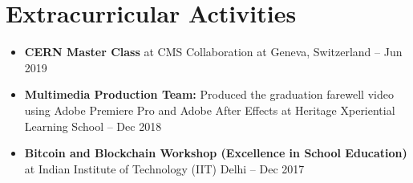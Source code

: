 \documentclass[letterpaper,11pt]{article}
\newcommand{\resumeItem}[1]{
  \item\normalsize{#1}
}
\newcommand{\resumeItemListStart}{\begin{itemize}[leftmargin=0.15in, topsep=1.5pt, itemsep=1.5pt, parsep=0pt]}
\newcommand{\resumeItemListEnd}{\end{itemize}}
\begin{document}
\section{Extracurricular Activities}
\resumeItemListStart
\resumeItem{\textbf{CERN Master Class} at CMS Collaboration at Geneva, Switzerland -- Jun 2019}
\resumeItem{\textbf{Multimedia Production Team:} Produced the graduation farewell video using Adobe Premiere Pro and Adobe After Effects at Heritage Xperiential Learning School -- Dec 2018}
\resumeItem{\textbf{Bitcoin and Blockchain Workshop (Excellence in School Education)} at Indian Institute of Technology (IIT) Delhi -- Dec 2017}
\resumeItemListEnd
\end{document}
